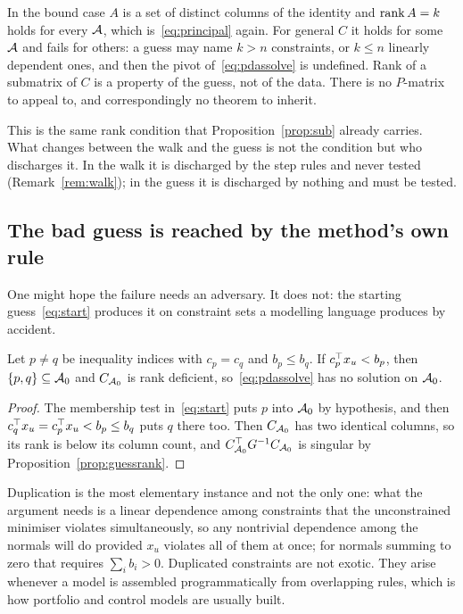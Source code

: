 In the bound case $A$ is a set of distinct columns of the identity and
$\operatorname{rank} A = k$ holds for every $\mathcal{A}$, which is~\eqref{eq:principal} again. For
general $C$ it holds for some $\mathcal{A}$ and fails for others: a guess may name
$k > n$ constraints, or $k \le n$ linearly dependent ones, and then the pivot
of~\eqref{eq:pdassolve} is undefined. Rank of a submatrix of $C$ is a property of
the guess, not of the data. There is no $P$-matrix to appeal to, and
correspondingly no theorem to inherit.

This is the same rank condition that Proposition~\ref{prop:sub} already carries.
What changes between the walk and the guess is not the condition but who
discharges it. In the walk it is discharged by the step rules and never tested
(Remark~\ref{rem:walk}); in the guess it is discharged by nothing and must be
tested.

\subsection{The bad guess is reached by the method's own rule}

One might hope the failure needs an adversary. It does not: the starting
guess~\eqref{eq:start} produces it on constraint sets a modelling language
produces by accident.

\begin{proposition}\label{prop:reachable}
Let $p \neq q$ be inequality indices with $c_p = c_q$ and $b_p \le b_q$. If
$c_p^{\top} x_u < b_p$, then $\{p,q\} \subseteq \mathcal{A}_0$ and $C_{\mathcal{A}_0}$ is rank
deficient, so~\eqref{eq:pdassolve} has no solution on $\mathcal{A}_0$.
\end{proposition}

\begin{proof}
The membership test in~\eqref{eq:start} puts $p$ into $\mathcal{A}_0$ by hypothesis,
and then $c_q^{\top} x_u = c_p^{\top} x_u < b_p \le b_q$ puts $q$ there too.
Then $C_{\mathcal{A}_0}$ has two identical columns, so its rank is below its column
count, and $C_{\mathcal{A}_0}^{\top} G^{-1} C_{\mathcal{A}_0}$ is singular by
Proposition~\ref{prop:guessrank}.
\end{proof}

Duplication is the most elementary instance and not the only one: what the
argument needs is a linear dependence among constraints that the unconstrained
minimiser violates simultaneously, so any nontrivial dependence among the normals
will do provided $x_u$ violates all of them at once; for normals summing to zero
that requires $\sum_i b_i > 0$. Duplicated constraints are not exotic. They arise whenever a model is
assembled programmatically from overlapping rules, which is how portfolio and
control models are usually built.

